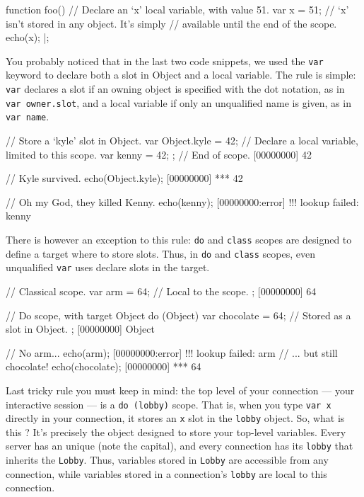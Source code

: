 \begin{urbiscript}
function foo()
{
  // Declare an `x' local variable, with value 51.
  var x = 51;
  // `x' isn't stored in any object. It's simply
  // available until the end of the scope.
  echo(x);
}|;
\end{urbiscript}

You probably noticed that in the last two code snippets, we used the
\lstinline|var| keyword to declare both a slot in Object and a local
variable. The rule is simple: \lstinline|var| declares a slot if an
owning object is specified with the dot notation, as in %
\lstinline|var owner.slot|, and a local variable if only an
unqualified name is given, as in \lstinline|var name|.

\begin{urbiscript}
{
  // Store a `kyle' slot in Object.
  var Object.kyle = 42;
  // Declare a local variable, limited to this scope.
  var kenny = 42;
}; // End of scope.
[00000000] 42

// Kyle survived.
echo(Object.kyle);
[00000000] *** 42

// Oh my God, they killed Kenny.
echo(kenny);
[00000000:error] !!! lookup failed: kenny
\end{urbiscript}

There is however an exception to this rule: \lstinline|do| and
\lstinline|class| scopes are designed to define a target where to
store slots. Thus, in \lstinline|do| and \lstinline|class| scopes,
even unqualified \lstinline|var| uses declare slots in the target.

\begin{urbiscript}
// Classical scope.
{
  var arm = 64; // Local to the scope.
};
[00000000] 64

// Do scope, with target Object
do (Object)
{
  var chocolate = 64; // Stored as a slot in Object.
};
[00000000] Object

// No arm...
echo(arm);
[00000000:error] !!! lookup failed: arm
// ... but still chocolate!
echo(chocolate);
[00000000] *** 64
\end{urbiscript}

Last tricky rule you must keep in mind: the top level of your
connection --- your interactive session --- is a %
\lstinline|do (lobby)| scope. That is, when you type \lstinline|var x|
directly in your connection, it stores an \lstinline|x| slot in the
\lstinline|lobby| object. So, what is this ? It's precisely
the object designed to store your top-level variables. Every \urbi
server has an unique  (note the capital), and every
connection has its \lstinline|lobby| that inherits the
\lstinline|Lobby|. Thus, variables stored in \lstinline|Lobby| are
accessible from any connection, while variables stored in a
connection's \lstinline|lobby| are local to this connection.

